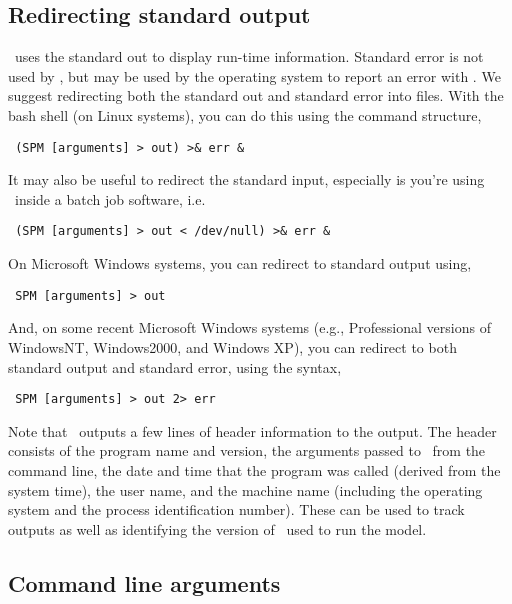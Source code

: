 \subsection{Redirecting standard output\label{sec:redirecting-stdout}}

\SPM\ uses the standard out to display run-time information. Standard error is not used by \SPM, but may be used by the operating system to report an error with \SPM. We suggest redirecting both the standard out and standard error into files. With the bash shell (on Linux systems), you can do this using the command structure,

\begin{verbatim} (SPM [arguments] > out) >& err &\end{verbatim}

It may also be useful to redirect the standard input, especially is you're using \SPM\ inside a batch job software, i.e. 

\begin{verbatim} (SPM [arguments] > out < /dev/null) >& err &\end{verbatim}

On Microsoft Windows systems, you can redirect to standard output using,

\begin{verbatim} SPM [arguments] > out\end{verbatim}

And, on some recent Microsoft Windows systems (e.g., Professional versions of WindowsNT, Windows2000, and Windows XP), you can redirect to both standard output and standard error, using the syntax, 

\begin{verbatim} SPM [arguments] > out 2> err\end{verbatim}

Note that \SPM\ outputs a few lines of header information to the output. The header consists of the program name and version, the arguments passed to \SPM\ from the command line, the date and time that the program was called (derived from the system time), the user name, and the machine name (including the operating system and the process identification number). These can be used to track outputs as well as identifying the version of \SPM\ used to run the model.

\subsection{Command line arguments\label{sec:command-line-arguments}}

